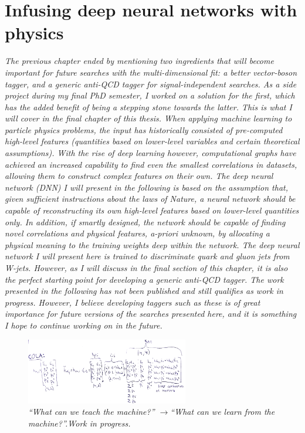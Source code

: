 \vspace*{\fill}

\section*{Infusing deep neural networks with physics}
\label{sec:lolaintro}
\begin{centering}
\textit{
The previous chapter ended by mentioning two ingredients that will become important for future searches with the multi-dimensional fit: a better vector-boson tagger, and a generic anti-QCD tagger for signal-independent searches. As a side project during my final PhD semester, I worked on a solution for the first, which has the added benefit of being a stepping stone towards the latter. This is what I will cover in the final chapter of this thesis.
\newline
\newline
When applying machine learning to particle physics problems, the input has historically consisted of pre-computed high-level features (quantities based on lower-level variables and certain theoretical assumptions).
With the rise of deep learning however, computational graphs have achieved an increased capability to find even the smallest correlations in datasets, allowing them to construct complex features on their own. The deep neural network (DNN) I will present in the following is based on the assumption that, given sufficient instructions about the laws of Nature, a neural network should be capable of reconstructing its own high-level features based on lower-level quantities only. In addition, if smartly designed, the network should be capable of finding novel correlations and physical features, a-priori unknown, by allocating a physical meaning to the training weights deep within the network. The deep neural network I will present here is trained to discriminate quark and gluon jets from W-jets. However, as I will discuss in the final section of this chapter, it is also the perfect starting point for developing a generic anti-QCD tagger.
\newline
\newline
The work presented in the following has not been published and still qualifies as work in progress. However, I believe developing taggers such as these is of great importance for future versions of the searches presented here, and it is something I hope to continue working on in the future.
}
\begin{figure}[b!] 
    \centering
    \includegraphics[width=7.1cm]{figures/vtagging/misc/cola.png}
    \vspace*{5mm}
    \caption*{\footnotesize{\textit{ ``What can we teach the machine?'' $\rightarrow$``What can we learn from the machine?''.\newline Work in progress.}}}
\end{figure}
\end{centering}
\clearpage
